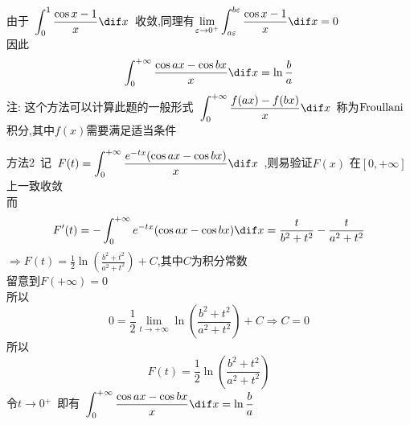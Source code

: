 \documentclass[color=green,titlestyle=hang]{elegantbook}%
\begin{document}
\begin{solution}
\begin{equation*}
\end{equation*}
由于~$\displaystyle\int_0^1 {\frac{{\cos x - 1}}{x}\dif x} $~收敛,同理有$\displaystyle\lim\limits_{\varepsilon  \to {0^ + }} \int_{a\varepsilon }^{b\varepsilon } {\frac{{\cos x - 1}}{x}\dif x}  = 0$\\
因此\[\int_0^{+\infty}  {\frac{{\cos ax - \cos bx}}{x}\dif x}  = \ln \frac{b}{a}\]
注: 这个方法可以计算此题的一般形式~$\displaystyle\int_0^{+\infty}  {\frac{{f(ax) - f(bx)}}{x}\dif x}$~称为${\rm{Froullani}}$积分,其中$f(x)$需要满足适当条件	
\end{solution}
\begin{solution}方法2~记~$\displaystyle F(t) = \int_0^{+\infty}  {\frac{{{e^{ - tx}}(\cos ax - \cos bx)}}{x}\dif x}$~,则易验证$F(x)$ 在$[0,+\infty]$上一致收敛
\\而\[F'(t) =  - \int_0^{+\infty}  {{e^{ - tx}}(\cos ax - \cos bx)\dif x}  = \frac{t}{{{b^2} + {t^2}}} - \frac{t}{{{a^2} + {t^2}}}\]
$\displaystyle\Rightarrow F(t) = \frac{1}{2}\ln \left( {\frac{{{b^2} + {t^2}}}{{{a^2} + {t^2}}}} \right) + C$,其中$C$为积分常数
\\留意到$F(+\infty)=0$
\\所以\[0 = \frac{1}{2}\mathop {\lim }\limits_{t \to  + \infty } \ln \left( {\frac{{{b^2} + {t^2}}}{{{a^2} + {t^2}}}} \right) + C \Rightarrow C = 0\]
所以\[F(t) = \frac{1}{2}\ln \left( {\frac{{{b^2} + {t^2}}}{{{a^2} + {t^2}}}} \right)\]
令$t \to 0{}^ + $~即有~$\displaystyle\int_0^{+\infty}  {\frac{{\cos ax - \cos bx}}{x}\dif x}  = \ln \frac{b}{a}$\end{solution}	
\end{document}
